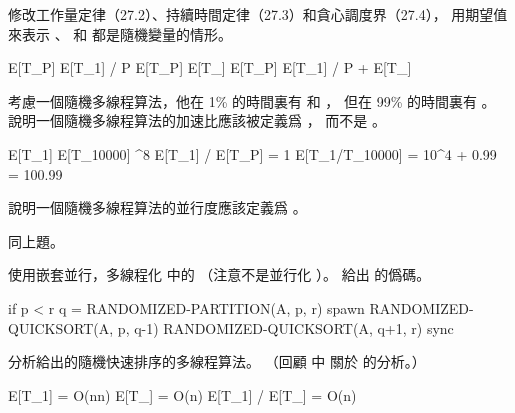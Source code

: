\startigBase[a]\startitem
修改工作量定律（27.2）、持續時間定律（27.3）和貪心調度界（27.4），
用期望值來表示 、  和  都是隨機變量的情形。
\stopitem\stopigBase

\startANSWER
\startformula\startmathalignment
\NC E[T_P] \NC \ge E[T_1] / P \NR
\NC E[T_P] \NC \ge E[T_{\infty}] \NR
\NC E[T_P] \NC \ge E[T_1] / P + E[T_{\infty}] \NR
\stopmathalignment\stopformula
\stopANSWER

\startigBase[continue]\startitem
考慮一個隨機多線程算法，他在 1\% 的時間裏有  和 ，
但在 99\% 的時間裏有 。
說明一個隨機多線程算法的{\EMP 加速比}應該被定義爲 ，
而不是 。
\stopitem\stopigBase

\startANSWER
\startformula\startmathalignment
\NC E[T_1] \NC \approx E[T_{10000}]  ^8 \NR
\NC E[T_1] / E[T_P] \NC = 1 \NR
\NC E[T_1/T_{10000}] \NC = 10^4  + 0.99 = 100.99 \NR
\stopmathalignment\stopformula
\stopANSWER

\startigBase[continue]\startitem
說明一個隨機多線程算法的{\EMP 並行度}應該定義爲 。
\stopitem\stopigBase

\startANSWER
同上題。
\stopANSWER

\startigBase[continue]\startitem
使用嵌套並行，多線程化 中的 
（注意不是並行化 ）。
給出  的僞碼。
\stopitem\stopigBase

\startANSWER
{}
\startCLRS
if p < r
	q = RANDOMIZED-PARTITION(A, p, r)
	spawn RANDOMIZED-QUICKSORT(A, p, q-1)
	RANDOMIZED-QUICKSORT(A, q+1, r)
	sync
\stopCLRS
\stopANSWER

\startigBase[continue]\startitem
分析給出的隨機快速排序的多線程算法。
（\hint 回顧 中
關於  的分析。）
\stopitem\stopigBase

\startANSWER
\startformula\startmathalignment
\NC E[T_1] \NC = O(n\lg n) \NR
\NC E[T_{\infty}] \NC = O(\lg n) \NR
\NC E[T_1] / E[T_{\infty}] \NC = O(n) \NR
\stopmathalignment\stopformula
\stopANSWER
\stopPROBLEM

\stopsubject%
